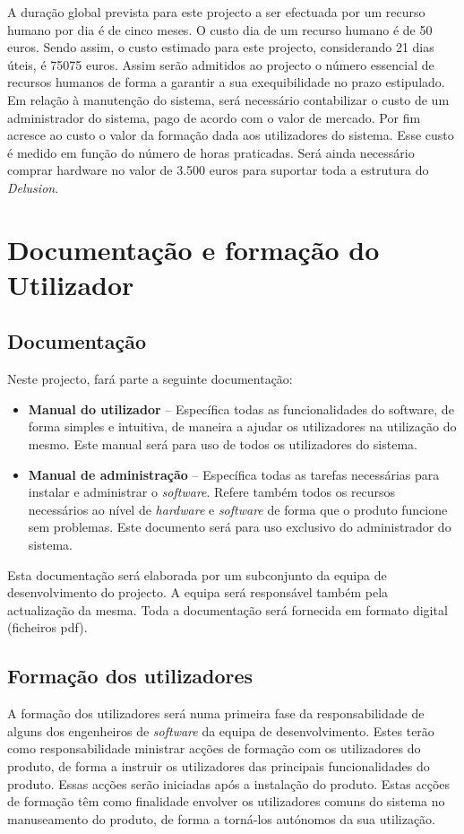 A duração global prevista para este projecto a ser efectuada por um recurso humano por dia é de cinco meses. O custo dia de um recurso humano é de 50 euros. Sendo assim, o custo estimado para este projecto, considerando 21 dias úteis, é 75075 euros. Assim serão admitidos ao projecto o número essencial de recursos humanos de forma a garantir a sua exequibilidade no prazo estipulado. 
Em relação à manutenção do sistema, será necessário contabilizar o custo de um administrador do sistema, pago de acordo com o valor de mercado.
Por fim acresce ao custo o valor da formação dada aos utilizadores do sistema. Esse custo é medido em função do número de horas praticadas.
Será ainda necessário comprar hardware no valor de 3.500 euros para suportar toda a estrutura do \textit{Delusion}.

\section{Documentação e formação do Utilizador}
\subsection{Documentação}
Neste projecto, fará parte a seguinte documentação:

\begin{itemize}
\item \textbf{Manual do utilizador} – Específica todas as funcionalidades do software, de forma simples e intuitiva, de maneira a ajudar os utilizadores na utilização do mesmo. Este manual será para uso de todos os utilizadores do sistema.

\item \textbf{Manual de administração} – Específica todas as tarefas necessárias para instalar e administrar o \emph{software}. Refere também todos os recursos necessários ao nível de \emph{hardware} e \emph{software} de forma que o produto funcione sem problemas. Este documento será para uso exclusivo do administrador do sistema.
\end{itemize}

Esta documentação será elaborada por um subconjunto da equipa de desenvolvimento do projecto. A equipa será responsável também pela actualização da mesma. Toda a documentação será fornecida em formato digital (ficheiros pdf). 

\subsection{Formação dos utilizadores}
A formação dos utilizadores será numa primeira fase da responsabilidade de alguns dos engenheiros de \emph{software} da equipa de desenvolvimento. Estes terão como responsabilidade ministrar acções de formação com os utilizadores do produto, de forma a instruir os utilizadores das principais funcionalidades do produto. Essas acções serão iniciadas após a instalação do produto. Estas acções de formação têm como finalidade envolver os utilizadores comuns do sistema no manuseamento do produto, de forma a torná-los autónomos da sua utilização.
